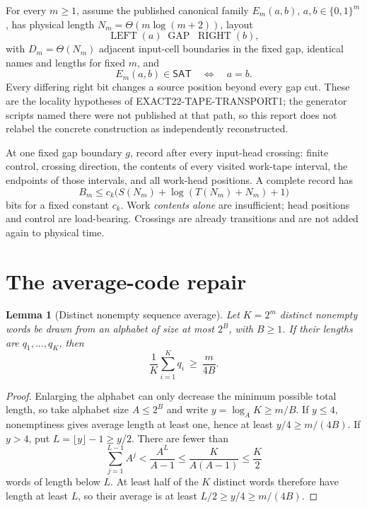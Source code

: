 \documentclass[11pt]{article}
\newtheorem{lemma}[theorem]{Lemma}
\newcommand{\SAT}{\mathsf{SAT}}
\begin{document}
For every $m\ge1$, assume the published canonical family $E_m(a,b)$, $a,b\in\{0,1\}^m$, has physical length $N_m=\Theta(m\log(m+2))$, layout
\[
       \operatorname{LEFT}(a)\;\operatorname{GAP}\;\operatorname{RIGHT}(b),
\]
with $D_m=\Theta(N_m)$ adjacent input-cell boundaries in the fixed gap, identical names and lengths for fixed $m$, and
\[
                  E_m(a,b)\in\SAT\quad\Longleftrightarrow\quad a=b. \tag{1}
\]
Every differing right bit changes a source position beyond every gap cut.  These are the locality hypotheses of EXACT22-TAPE-TRANSPORT1; the generator scripts named there were not published at that path, so this report does not relabel the concrete construction as independently reconstructed.

At one fixed gap boundary $g$, record after every input-head crossing: finite control, crossing direction, the contents of every visited work-tape interval, the endpoints of those intervals, and all work-head positions.  A complete record has
\[
 B_m\le c_k\bigl(S(N_m)+\log(T(N_m)+N_m)+1\bigr) \tag{2}
\]
bits for a fixed constant $c_k$.  Work \emph{contents alone} are insufficient; head positions and control are load-bearing.  Crossings are already transitions and are not added again to physical time.

\section{The average-code repair}
\begin{lemma}[Distinct nonempty sequence average]\label{lem:code}
Let $K=2^m$ distinct nonempty words be drawn from an alphabet of size at most $2^B$, with $B\ge1$.  If their lengths are $q_1,\ldots,q_K$, then
\[
                       \frac1K\sum_{i=1}^Kq_i\ \ge\ \frac{m}{4B}. \tag{3}
\]
\end{lemma}
\begin{proof}
Enlarging the alphabet can only decrease the minimum possible total length, so take alphabet size $A\le2^B$ and write $y=\log_A K\ge m/B$.  If $y\le4$, nonemptiness gives average length at least one, hence at least $y/4\ge m/(4B)$.  If $y>4$, put $L=\lfloor y\rfloor-1\ge y/2$.  There are fewer than
\[
       \sum_{j=1}^{L-1}A^j < \frac{A^L}{A-1}\le\frac{K}{A(A-1)}\le\frac K2
\]
words of length below $L$.  At least half of the $K$ distinct words therefore have length at least $L$, so their average is at least $L/2\ge y/4\ge m/(4B)$.
\end{proof}
\end{document}

